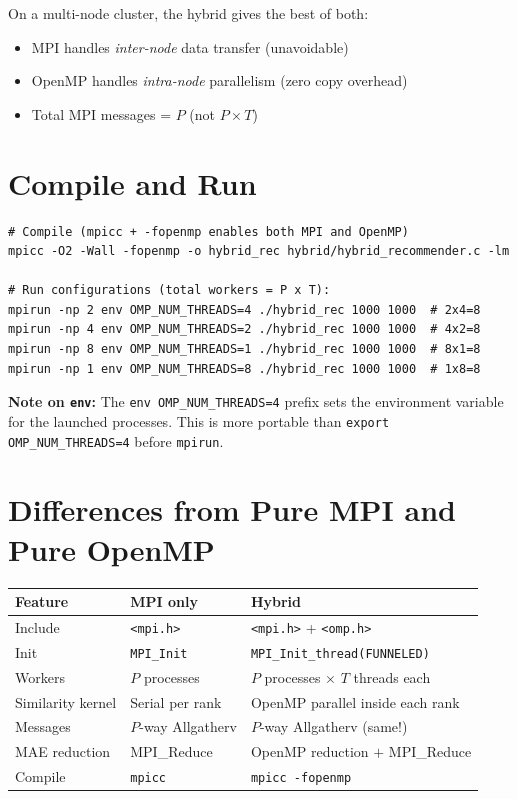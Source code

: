 \documentclass[12pt,a4paper]{article}
\begin{document}
On a multi-node cluster, the hybrid gives the best of both:
\begin{itemize}
    \item MPI handles \emph{inter-node} data transfer (unavoidable)
    \item OpenMP handles \emph{intra-node} parallelism (zero copy overhead)
    \item Total MPI messages = $P$ (not $P \times T$)
\end{itemize}

\section{Compile and Run}

\begin{verbatim}
# Compile (mpicc + -fopenmp enables both MPI and OpenMP)
mpicc -O2 -Wall -fopenmp -o hybrid_rec hybrid/hybrid_recommender.c -lm

# Run configurations (total workers = P x T):
mpirun -np 2 env OMP_NUM_THREADS=4 ./hybrid_rec 1000 1000  # 2x4=8
mpirun -np 4 env OMP_NUM_THREADS=2 ./hybrid_rec 1000 1000  # 4x2=8
mpirun -np 8 env OMP_NUM_THREADS=1 ./hybrid_rec 1000 1000  # 8x1=8
mpirun -np 1 env OMP_NUM_THREADS=8 ./hybrid_rec 1000 1000  # 1x8=8
\end{verbatim}

\textbf{Note on \texttt{env}:}  The \texttt{env OMP\_NUM\_THREADS=4}
prefix sets the environment variable for the launched processes.  This is
more portable than \texttt{export OMP\_NUM\_THREADS=4} before \texttt{mpirun}.

\section{Differences from Pure MPI and Pure OpenMP}

\begin{center}
\begin{tabular}{lll}
\toprule
Feature & MPI only & Hybrid \\
\midrule
Include & \texttt{<mpi.h>} & \texttt{<mpi.h>} + \texttt{<omp.h>} \\
Init & \texttt{MPI\_Init} & \texttt{MPI\_Init\_thread(FUNNELED)} \\
Workers & $P$ processes & $P$ processes $\times$ $T$ threads each \\
Similarity kernel & Serial per rank & OpenMP parallel inside each rank \\
Messages & $P$-way Allgatherv & $P$-way Allgatherv (same!) \\
MAE reduction & MPI\_Reduce & OpenMP reduction $+$ MPI\_Reduce \\
Compile & \texttt{mpicc} & \texttt{mpicc -fopenmp} \\
\bottomrule
\end{tabular}
\end{center}
\end{document}

